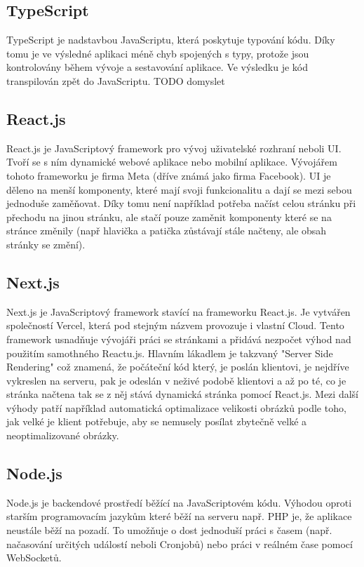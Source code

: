 \subsection{TypeScript}
TypeScript je nadstavbou JavaScriptu, která poskytuje typování kódu. Díky tomu je ve výsledné aplikaci méně chyb spojených s typy, protože jsou kontrolovány během vývoje a sestavování aplikace. Ve výsledku je kód transpilován zpět do JavaScriptu.
TODO domyslet

\subsection{React.js}
React.js je JavaScriptový framework pro vývoj uživatelské rozhraní neboli UI. Tvoří se s ním dynamické webové aplikace nebo mobilní aplikace. Vývojářem tohoto frameworku je firma Meta (dříve známá jako firma Facebook). UI je děleno na menší komponenty, které mají svoji funkcionalitu a dají se mezi sebou jednoduše zaměňovat. Díky tomu není například potřeba načíst celou stránku při přechodu na jinou stránku, ale stačí pouze zaměnit komponenty které se na stránce změnily (např hlavička a patička zůstávají stále načteny, ale obsah stránky se změní).

\subsection{Next.js}
Next.js je JavaScriptový framework stavící na frameworku React.js. Je vytvářen společností Vercel, která pod stejným názvem provozuje i vlastní Cloud. Tento framework usnadňuje vývojáři práci se stránkami a přidává nezpočet výhod nad použitím samothného Reactu.js. Hlavním lákadlem je takzvaný "Server Side Rendering" což znamená, že počáteční kód který, je poslán klientovi, je nejdříve vykreslen na serveru, pak je odeslán v neživé podobě klientovi a až po té, co je stránka načtena tak se z něj stává dynamická stránka pomocí React.js. Mezi další výhody patří například automatická optimalizace velikosti obrázků podle toho, jak velké je klient potřebuje, aby se nemusely posílat zbytečně velké a neoptimalizované obrázky.

\subsection{Node.js}
Node.js je backendové prostředí běžící na JavaScriptovém kódu. Výhodou oproti starším programovacím jazykům které běží na serveru např. PHP je, že aplikace neustále běží na pozadí. To umožňuje o dost jednoduší práci s časem (např. načasování určitých událostí neboli Cronjobů) nebo práci v reálném čase pomocí WebSocketů.


